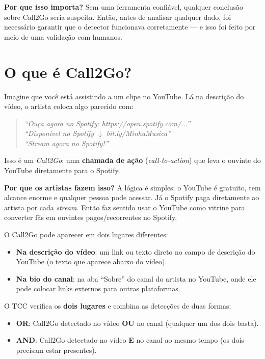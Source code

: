 \documentclass[12pt,a4paper]{article}
\newcommand{\term}[1]{\textcolor{roxo}{\textit{#1}}}
\begin{document}
\textbf{Por que isso importa?} Sem uma ferramenta confiável, qualquer conclusão
sobre Call2Go seria suspeita. Então, antes de analisar qualquer dado, foi
necessário garantir que o detector funcionava corretamente --- e isso foi feito
por meio de uma validação com humanos.

\section{O que é Call2Go?}

Imagine que você está assistindo a um clipe no YouTube. Lá na descrição do
vídeo, o artista coloca algo parecido com:

\begin{quote}
  \textit{``Ouça agora no Spotify: https://open.spotify.com/...''} \\
  \textit{``Disponível no Spotify $\downarrow$ bit.ly/MinhaMusica''} \\
  \textit{``Stream agora no Spotify!''}
\end{quote}

Isso é um \term{Call2Go}: uma \textbf{chamada de ação} (\textit{call-to-action})
que leva o ouvinte do YouTube diretamente para o Spotify.

\textbf{Por que os artistas fazem isso?} A lógica é simples: o YouTube é
gratuito, tem alcance enorme e qualquer pessoa pode acessar. Já o Spotify paga
diretamente ao artista por cada \textit{stream}. Então faz sentido usar o YouTube
como vitrine para converter fãs em ouvintes pagos/recorrentes no Spotify.

O Call2Go pode aparecer em dois lugares diferentes:
\begin{itemize}
  \item \textbf{Na descrição do vídeo}: um link ou texto direto no campo de
        descrição do YouTube (o texto que aparece abaixo do vídeo).
  \item \textbf{Na bio do canal}: na aba ``Sobre'' do canal do artista no
        YouTube, onde ele pode colocar links externos para outras plataformas.
\end{itemize}

O TCC verifica os \textbf{dois lugares} e combina as detecções de duas formas:
\begin{itemize}
  \item \textbf{OR}: Call2Go detectado no vídeo \textbf{OU} no canal
        (qualquer um dos dois basta).
  \item \textbf{AND}: Call2Go detectado no vídeo \textbf{E} no canal ao mesmo
        tempo (os dois precisam estar presentes).
\end{itemize}
\end{document}
